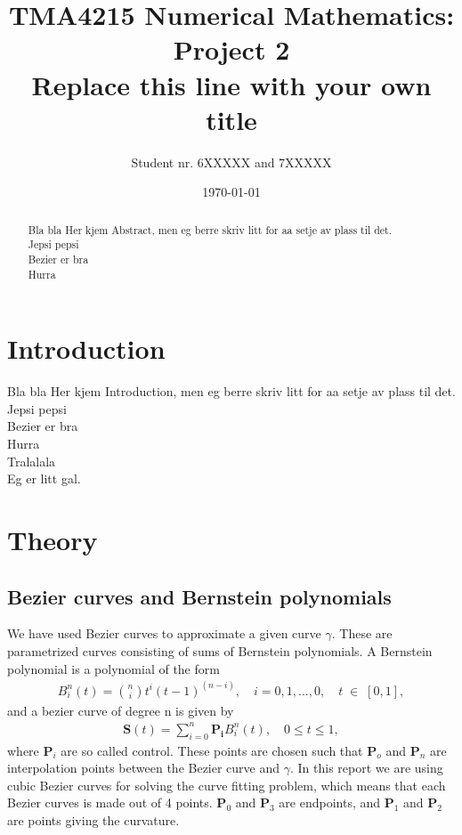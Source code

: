 \documentclass[10pt]{article}
\title{TMA4215 Numerical Mathematics: Project 2 \\ Replace this line with your own title}
\author{Student nr. 6XXXXX and 7XXXXX} %
\date{\today}
\begin{document}
\maketitle
\begin{abstract}

Bla bla Her kjem Abstract, men eg berre skriv litt for aa setje av plass til det. \\
Jepsi pepsi \\
Bezier er bra \\
Hurra \\

\end{abstract}

\section{Introduction} 

Bla bla Her kjem Introduction, men eg berre skriv litt for aa setje av plass til det. \\
Jepsi pepsi \\
Bezier er bra \\
Hurra \\
Tralalala \\
Eg er litt gal. \\

\section{Theory}

\subsection*{Bezier curves and Bernstein polynomials}

We have used Bezier curves to approximate a given curve $\gamma$. These are parametrized curves consisting of sums of Bernstein polynomials. A Bernstein polynomial is a polynomial of the form
\begin{align}
B_{i}^n(t) = \binom{n}{i}t^i(t-1)^{(n-i)},\quad i = 0, 1, ..., 0,\quad t \; \in \; [0,1],
\end{align}
and a bezier curve of degree n is given by
\begin{align}
\mathbf{S}(t) = \sum_{i=0}^{n} \mathbf{P_i} B_{i}^n(t), \quad 0 \leq t \leq 1,
\end{align}
where $\mathbf{P}_i$ are so called control. These points are chosen such that $\mathbf{P}_o$ and $\mathbf{P}_n$ are interpolation points between the Bezier curve and $\gamma$. In this report we are using cubic Bezier curves for solving the curve fitting problem, which means that each Bezier curves is made out of 4 points. $\mathbf{P}_0$ and $\mathbf{P}_3$ are endpoints, and $\mathbf{P}_1$ and $\mathbf{P}_2$ are points giving the curvature.
\end{document}
